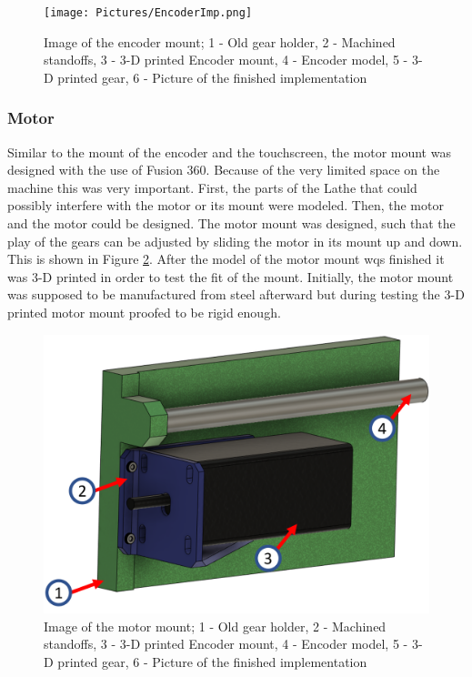 \begin{figure}
    \begin{center}
    \texttt{[image: Pictures/EncoderImp.png]}
    \caption[Image of the encoder mount]{Image of the encoder mount; 1 - Old gear holder, 2 - Machined standoffs, 3 - 3-D printed Encoder mount, 4 - Encoder model, 5 - 3-D printed gear, 6 - Picture of the finished implementation}
    \label{EncoderImp}
    \end{center}
\end{figure}

\subsubsection{Motor}
Similar to the mount of the encoder and the touchscreen, the motor mount was designed with the use of Fusion 360. Because of the very limited space on the machine this was very important. First, the parts of the Lathe that could possibly interfere with the motor or its mount were modeled. Then, the motor and the motor could be designed. The motor mount was designed, such that the play of the gears can be adjusted by sliding the motor in its mount up and down. This is shown in Figure \ref{MotorImp}. After the model of the motor mount wqs finished it was 3-D printed in order to test the fit of the mount. Initially, the motor mount was supposed to be manufactured from steel afterward but during testing the 3-D printed motor mount proofed to be rigid enough.

\begin{figure}
    \begin{center}
    \includegraphics[width=12cm]{Pictures/MotorImp.png}
    \caption[Image of the motor mount]{Image of the motor mount; 1 - Old gear holder, 2 - Machined standoffs, 3 - 3-D printed Encoder mount, 4 - Encoder model, 5 - 3-D printed gear, 6 - Picture of the finished implementation}
    \label{MotorImp}
    \end{center}
\end{figure}

